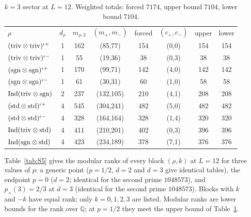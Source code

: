 \documentclass[aps,prx,reprint,superscriptaddress,nobibnotes,longbibliography]{revtex4-2}
\begin{document}
\begin{table}[h]
\caption{$k=3$ sector at $L=12$.  Weighted totals: forced $7174$, upper bound $7104$, lower bound $7104$.}
\label{tab:S4}
\setlength{\tabcolsep}{2pt}\footnotesize
\begin{ruledtabular}
\begin{tabular}{lccccccc}
$\rho$ & $d_\rho$ & $m_{\rho,3}$ & $(m_+,m_-)$ & forced & $(c_+,c_-)$ & upper & lower\\
\colrule
$({\rm triv}\otimes{\rm triv})^{\iota+}$ & 1 & 162 & (85,77) & 154 & (0,0) & 154 & 154\\
$({\rm triv}\otimes{\rm triv})^{\iota-}$ & 1 & 55 & (19,36) & 38 & (0,3) & 38 & 38\\
$({\rm sgn}\otimes{\rm sgn})^{\iota+}$ & 1 & 170 & (99,71) & 142 & (4,0) & 142 & 142\\
$({\rm sgn}\otimes{\rm sgn})^{\iota-}$ & 1 & 61 & (30,31) & 60 & (1,0) & 58 & 58\\
${\rm Ind}({\rm triv}\otimes{\rm sgn})$ & 2 & 237 & (132,105) & 210 & (4,1) & 208 & 208\\
$({\rm std}\otimes{\rm std})^{\iota+}$ & 4 & 545 & (304,241) & 482 & (5,0) & 482 & 482\\
$({\rm std}\otimes{\rm std})^{\iota-}$ & 4 & 328 & (164,164) & 328 & (1,4) & 320 & 320\\
${\rm Ind}({\rm triv}\otimes{\rm std})$ & 4 & 411 & (210,201) & 402 & (0,3) & 396 & 396\\
${\rm Ind}({\rm sgn}\otimes{\rm std})$ & 4 & 423 & (234,189) & 378 & (7,1) & 376 & 376\\
\end{tabular}
\end{ruledtabular}
\end{table}

Table~\ref{tab:S5} gives the modular ranks of every block $(\rho,k)$ at $L=12$ for three values of $p$: a generic point ($p=1/2$, $d=2$ and $d=3$ give identical tables), the endpoint $p=0$ ($d=2$; identical for the second prime $1048573$), and $p_\times(3)=2/3$ at $d=3$ (identical for the second prime $1048573$).  Blocks with $k$ and $-k$ have equal rank; only $k=0,1,2,3$ are listed.  Modular ranks are lower bounds for the rank over $\mathbb Q$; at $p=1/2$ they meet the upper bound of Table~\ref{tab:S4}.
\end{document}
